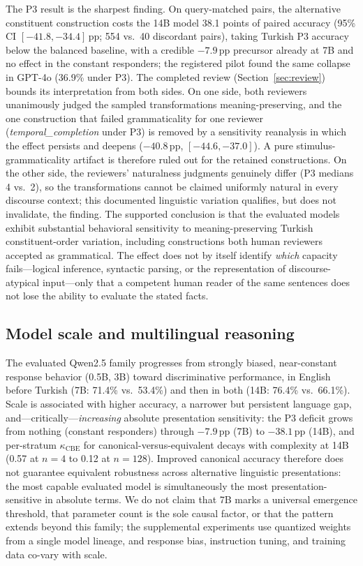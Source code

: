 The P3 result is the sharpest finding. On query-matched pairs, the alternative constituent construction
costs the 14B model 38.1 points of paired accuracy (95\% CI $[-41.8, -34.4]$\,pp; 554 vs.\ 40 discordant
pairs), taking Turkish P3 accuracy below the balanced baseline, with a credible $-7.9$\,pp precursor already
at 7B and no effect in the constant responders; the registered pilot found the same collapse in GPT-4o
(36.9\% under P3). The completed review (Section~\ref{sec:review}) bounds its interpretation from both
sides. On one side, both reviewers unanimously judged the sampled transformations meaning-preserving, and
the one construction that failed grammaticality for one reviewer (\emph{temporal\_completion} under P3) is
removed by a sensitivity reanalysis in which the effect persists and deepens ($-40.8$\,pp,
$[-44.6, -37.0]$). A pure stimulus-grammaticality artifact is therefore ruled out for the retained
constructions. On the other side, the reviewers' naturalness judgments genuinely differ (P3 medians 4
vs.\ 2), so the transformations cannot be claimed uniformly natural in every discourse context; this
documented linguistic variation qualifies, but does not invalidate, the finding. The supported conclusion
is that the evaluated models exhibit substantial behavioral sensitivity to meaning-preserving Turkish
constituent-order variation, including constructions both human reviewers accepted as grammatical. The
effect does not by itself identify \emph{which} capacity fails---logical inference, syntactic parsing, or
the representation of discourse-atypical input---only that a competent human reader of the same sentences
does not lose the ability to evaluate the stated facts.

\subsection{Model scale and multilingual reasoning}

The evaluated Qwen2.5 family progresses from strongly biased, near-constant response behavior (0.5B, 3B)
toward discriminative performance, in English before Turkish (7B: 71.4\% vs.\ 53.4\%) and then in both
(14B: 76.4\% vs.\ 66.1\%). Scale is associated with higher accuracy, a narrower but persistent language
gap, and---critically---\emph{increasing} absolute presentation sensitivity: the P3 deficit grows from
nothing (constant responders) through $-7.9$\,pp (7B) to $-38.1$\,pp (14B), and per-stratum
$\kappa_{\mathrm{CBE}}$ for canonical-versus-equivalent decays with complexity at 14B (0.57 at $n{=}4$ to
0.12 at $n{=}128$). Improved canonical accuracy therefore does not guarantee equivalent robustness across
alternative linguistic presentations: the most capable evaluated model is simultaneously the most
presentation-sensitive in absolute terms. We do not claim that 7B marks a universal emergence threshold,
that parameter count is the sole causal factor, or that the pattern extends beyond this family; the
supplemental experiments use quantized weights from a single model lineage, and response bias, instruction
tuning, and training data co-vary with scale.

